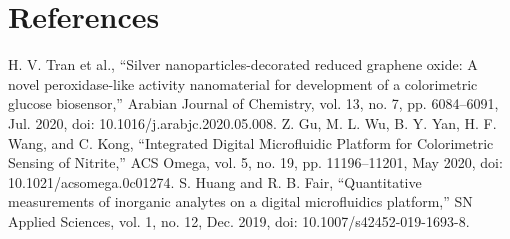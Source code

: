 \documentclass[conference]{IEEEtran}
\begin{document}
\section*{References}


\begin{thebibliography}{00}
 H. V. Tran et al., “Silver nanoparticles-decorated reduced graphene oxide: A novel peroxidase-like activity nanomaterial for development of a colorimetric glucose biosensor,” Arabian Journal of Chemistry, vol. 13, no. 7, pp. 6084–6091, Jul. 2020, doi: 10.1016/j.arabjc.2020.05.008.
 Z. Gu, M. L. Wu, B. Y. Yan, H. F. Wang, and C. Kong, “Integrated Digital Microfluidic Platform for Colorimetric Sensing of Nitrite,” ACS Omega, vol. 5, no. 19, pp. 11196–11201, May 2020, doi: 10.1021/acsomega.0c01274.
 S. Huang and R. B. Fair, “Quantitative measurements of inorganic analytes on a digital microfluidics platform,” SN Applied Sciences, vol. 1, no. 12, Dec. 2019, doi: 10.1007/s42452-019-1693-8.
\end{thebibliography}
\end{document}
